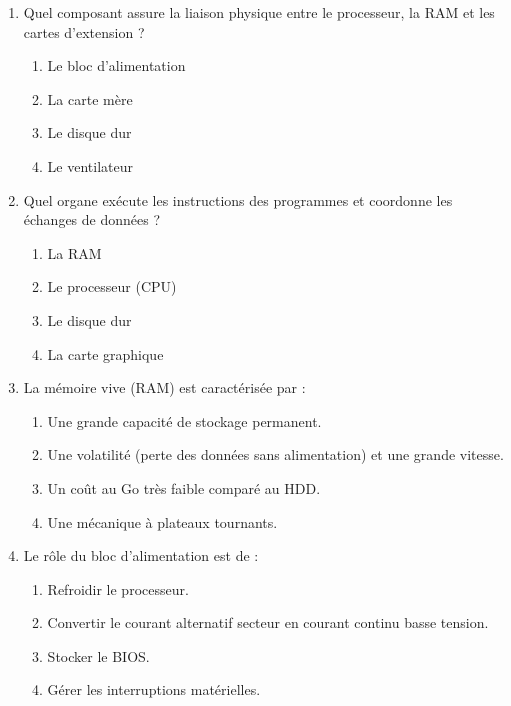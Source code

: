 \documentclass[11pt]{article}
\begin{document}
\begin{exercice}
\begin{enumerate}
    \item Quel composant assure la liaison physique entre le processeur, la RAM et les cartes d'extension ?
    \begin{enumerate}
        \item Le bloc d'alimentation
        \item La carte mère
        \item Le disque dur
        \item Le ventilateur
    \end{enumerate}
    \item Quel organe exécute les instructions des programmes et coordonne les échanges de données ?
    \begin{enumerate}
        \item La RAM
        \item Le processeur (CPU)
        \item Le disque dur
        \item La carte graphique
    \end{enumerate}
    \item La mémoire vive (RAM) est caractérisée par :
    \begin{enumerate}
        \item Une grande capacité de stockage permanent.
        \item Une volatilité (perte des données sans alimentation) et une grande vitesse.
        \item Un coût au Go très faible comparé au HDD.
        \item Une mécanique à plateaux tournants.
    \end{enumerate}
    \item Le rôle du bloc d'alimentation est de :
    \begin{enumerate}
        \item Refroidir le processeur.
        \item Convertir le courant alternatif secteur en courant continu basse tension.
        \item Stocker le BIOS.
        \item Gérer les interruptions matérielles.
    \end{enumerate}
\end{enumerate}
\end{exercice}
\end{document}
